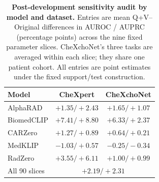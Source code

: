 \begin{table}[t]
\centering
\caption{\textbf{Post-development sensitivity audit by model and dataset.} Entries are mean Q+V--Original differences in AUROC / AUPRC (percentage points) across the nine fixed parameter slices. CheXchoNet's three tasks are averaged within each slice; they share one patient cohort. All entries are point estimates under the fixed support/test construction.}
\label{tab:supp-sensitivity-model}
\small
\setlength{\tabcolsep}{5pt}
\begin{tabular*}{\textwidth}{@{\extracolsep{\fill}}lcc@{}}
\toprule
Model & CheXpert & CheXchoNet \\
\midrule
AlphaRAD & $+1.35 / +2.43$ & $+1.65 / +1.07$ \\
BiomedCLIP & $+7.41 / +8.80$ & $+6.33 / +2.37$ \\
CARZero & $+1.27 / +0.89$ & $+0.64 / +0.21$ \\
MedKLIP & $-1.03 / +0.57$ & $-0.25 / -0.34$ \\
RadZero & $+3.55 / +6.11$ & $+1.00 / +0.99$ \\
\midrule
All 90 slices & \multicolumn{2}{c}{$+2.19 / +2.31$} \\
\bottomrule
\end{tabular*}
\end{table}
